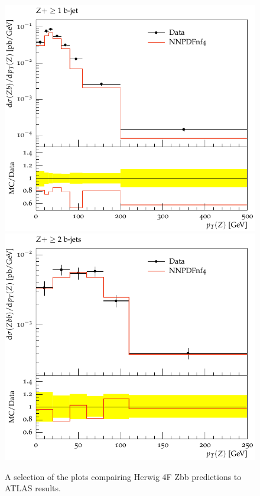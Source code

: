 \documentclass[11pt]{cernrep} \usepackage{graphicx,epsfig} 
\begin{document}
\begin{figure}[htbp]
\begin{center}
   \includegraphics[scale=0.65]{figs/zbb/herwig4F/d15-x01-y01.pdf} 
   \includegraphics[scale=0.65]{figs/zbb/herwig4F/d25-x01-y01.pdf} 
\caption{A selection of the plots compairing Herwig 4F Zbb predictions to ATLAS results.}
\label{zbb-herwig4F-atlas}
\end{center}
\end{figure}
\end{document}

